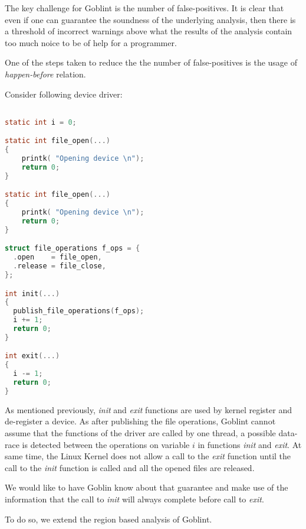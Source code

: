 \documentclass[..thesis.tex]{subfiles}
\begin{document}

The key challenge for Goblint is the number of false-positives. It is clear that even if one can guarantee the soundness of the 
underlying analysis, then there is a threshold of incorrect warnings above what the results of the analysis contain too much noice
to be of help for a programmer.


One of the steps taken to reduce the the number of false-positives is the usage of \textit{happen-before} relation.


Consider following device driver:

\begin{lstlisting}[language=c,style=def]

static int i = 0;

static int file_open(...)
{
    printk( "Opening device \n");
    return 0;
}

static int file_open(...)
{
    printk( "Opening device \n");
    return 0;
}

struct file_operations f_ops = {
  .open    = file_open,
  .release = file_close,
};

int init(...)
{
  publish_file_operations(f_ops);
  i += 1;
  return 0;
}

int exit(...)
{
  i -= 1;
  return 0;
}

\end{lstlisting}

As mentioned previously, \textit{init} and \textit{exit} functions are used by kernel register and de-register a device. As after publishing the file operations, Goblint cannot assume that the functions of the driver are called by one thread, a possible data-race is detected between the operations on variable $i$ in functions \textit{init} and \textit{exit}. At same time, the Linux Kernel does not allow a call to the \textit{exit} function until the call to the \textit{init} function is called and all the opened files are released.

We would like to have Goblin know about that guarantee and make use of the information that the call to \textit{init} will always complete before call to \textit{exit}.


To do so, we extend the region based analysis of Goblint.
\end{document}
